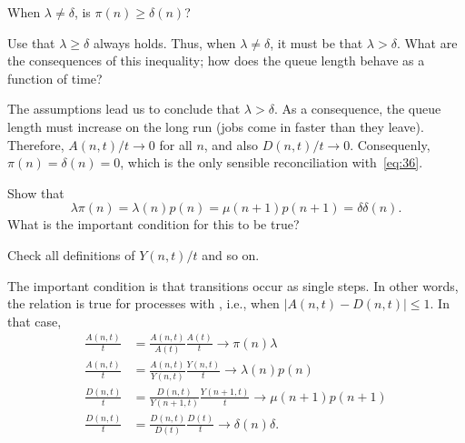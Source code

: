 \begin{exercise}\label{ex:26}
  When $\lambda\neq \delta$, is $\pi(n)\geq \delta(n)$? 
  \begin{hint}
    Use that    $\lambda \geq \delta$ always holds. Thus, when $\lambda \neq \delta$, it must be that $\lambda > \delta$. What are the consequences of this inequality; how does the queue length behave as a function of time?
  \end{hint}
  \begin{solution}
    The assumptions lead us to conclude that $\lambda > \delta$. As a consequence, the queue length must increase on the long run (jobs come in faster than they leave). Therefore, $A(n,t)/t \to 0$ for all $n$, and also $D(n,t)/t\to 0$. Consequenly, $\pi(n) = \delta(n) = 0$, which is the only sensible reconciliation with~\cref{eq:36}. 
  \end{solution}
\end{exercise}

\begin{extra}
Show that 
\begin{equation*}
\lambda  \pi(n) = \lambda(n) p(n) = \mu(n+1) p(n+1) = \delta \delta(n).
\end{equation*}
What is the important condition for this to be true?
\begin{hint}
Check all definitions of $Y(n,t)/t$ and so on.
\end{hint}
\begin{solution}
  The important condition is that transitions occur as single
  steps. In other words, the relation is true for processes with
  , i.e., when $|A(n,t) - D(n,t)|\leq 1$.
  In  that case, 
\begin{align*}
  \frac{A(n,t)}{t} &=   \frac{A(n,t)}{A(t)} \frac{A(t)}{t} \to \pi(n) \lambda\\
  \frac{A(n,t)}{t} &=   \frac{A(n,t)}{Y(n,t)} \frac{Y(n,t)}{t} \to \lambda(n)p(n)\\
  \frac{D(n,t)}{t} &=   \frac{D(n,t)}{Y(n+1,t)} \frac{Y(n+1,t)}{t} \to \mu(n+1)p(n+1)\\
  \frac{D(n,t)}{t} &=   \frac{D(n,t)}{D(t)} \frac{D(t)}{t} \to \delta(n)\delta. \\
\end{align*}
\end{solution}
\end{extra}


